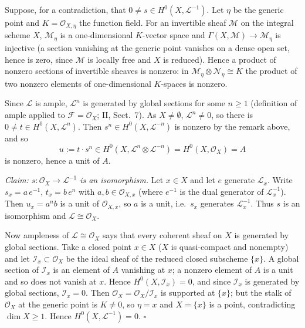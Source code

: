 \documentclass[11pt]{article}
\begin{document}
Suppose, for a contradiction, that $0\ne s\in H^0(X,\mathcal L^{-1})$. Let $\eta$ be the generic point and $K=\mathcal O_{X,\eta}$ the function field. For an invertible sheaf $\mathcal M$ on the integral scheme $X$, $\mathcal M_\eta$ is a one-dimensional $K$-vector space and $\Gamma(X,\mathcal M)\to\mathcal M_\eta$ is injective (a section vanishing at the generic point vanishes on a dense open set, hence is zero, since $\mathcal M$ is locally free and $X$ is reduced). Hence a product of nonzero sections of invertible sheaves is nonzero: in $\mathcal M_\eta\otimes\mathcal N_\eta\cong K$ the product of two nonzero elements of one-dimensional $K$-spaces is nonzero.

Since $\mathcal L$ is ample, $\mathcal L^n$ is generated by global sections for some $n\geq 1$ (definition of ample applied to $\mathcal F=\mathcal O_X$; II, Sect.~7). As $X\ne\emptyset$, $\mathcal L^n\neq0$, so there is $0\ne t\in H^0(X,\mathcal L^n)$. Then $s^n\in H^0(X,\mathcal L^{-n})$ is nonzero by the remark above, and so
\[
u:=t\cdot s^n\in H^0(X,\mathcal L^n\otimes\mathcal L^{-n})=H^0(X,\mathcal O_X)=A
\]
is nonzero, hence a unit of $A$.

\emph{Claim: $s\colon\mathcal O_X\to\mathcal L^{-1}$ is an isomorphism.} Let $x\in X$ and let $e$ generate $\mathcal L_x$. Write $s_x=a\,e^{-1}$, $t_x=b\,e^{n}$ with $a,b\in\mathcal O_{X,x}$ (where $e^{-1}$ is the dual generator of $\mathcal L^{-1}_x$). Then $u_x=a^nb$ is a unit of $\mathcal O_{X,x}$, so $a$ is a unit, i.e.\ $s_x$ generates $\mathcal L^{-1}_x$. Thus $s$ is an isomorphism and $\mathcal L\cong\mathcal O_X$.

Now ampleness of $\mathcal L\cong\mathcal O_X$ says that every coherent sheaf on $X$ is generated by global sections. Take a closed point $x\in X$ ($X$ is quasi-compact and nonempty) and let $\mathcal I_x\subset\mathcal O_X$ be the ideal sheaf of the reduced closed subscheme $\{x\}$. A global section of $\mathcal I_x$ is an element of $A$ vanishing at $x$; a nonzero element of $A$ is a unit and so does not vanish at $x$. Hence $H^0(X,\mathcal I_x)=0$, and since $\mathcal I_x$ is generated by global sections, $\mathcal I_x=0$. Then $\mathcal O_X=\mathcal O_X/\mathcal I_x$ is supported at $\{x\}$; but the stalk of $\mathcal O_X$ at the generic point is $K\neq0$, so $\eta=x$ and $X=\{x\}$ is a point, contradicting $\dim X\ge1$. Hence $H^0(X,\mathcal L^{-1})=0$.
\hfill$\square$
\end{document}
